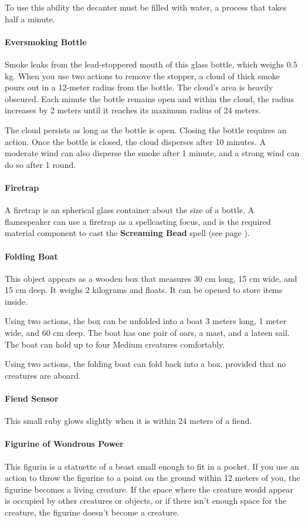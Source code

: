         To use this ability the decanter must be filled with water, a process that takes half a minute.
    \paragraph{Eversmoking Bottle}
        Smoke leaks from the lead-stoppered mouth of this glass bottle, which weighs 0.5 kg.
        When you use two actions to remove the stopper, a cloud of thick smoke pours out in a 12-meter radius from the bottle.
        The cloud's area is heavily obscured.
        Each minute the bottle remains open and within the cloud, the radius increases by 2 meters until it reaches its maximum radius of 24 meters.

        The cloud persists as long as the bottle is open.
        Closing the bottle requires an action.
        Once the bottle is closed, the cloud disperses after 10 minutes.
        A moderate wind can also disperse the smoke after 1 minute, and a strong wind can do so after 1 round.
    \paragraph{Firetrap}
        A firetrap is an spherical glass container about the size of a bottle.
        A flamespeaker can use a firetrap as a spellcasting focus, and is the required material component to cast the \textbf{Screaming Bead} spell (see page \pageref{spell::screamingbead}).
    \paragraph{Folding Boat}
        This object appears as a wooden box that measures 30 cm long, 15 cm wide, and 15 cm deep.
        It weighs 2 kilograms and floats.
        It can be opened to store items inside.

        Using two actions, the box can be unfolded into a boat 3 meters long, 1 meter wide, and 60 cm deep.
        The boat has one pair of oars, a mast, and a lateen sail.
        The boat can hold up to four Medium creatures comfortably.

        Using two actions, the folding boat can fold back into a box, provided that no creatures are aboard.
    \paragraph{Fiend Sensor}
        This small ruby glows slightly when it is within 24 meters of a fiend.
    \paragraph{Figurine of Wondrous Power}
        This figurin is a statuette of a beast small enough to fit in a pocket.
        If you use an action to throw the figurine to a point on the ground within 12 meters of you, the figurine becomes a living creature.
        If the space where the creature would appear is occupied by other creatures or objects, or if there isn't enough space for the creature, the figurine doesn't become a creature.

